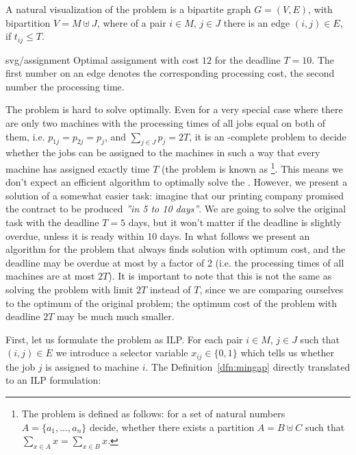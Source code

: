 \noindent
A natural visualization of the problem is a bipartite graph $G=(V,E)$, with bipartition $V=M\uplus J$,
where of a pair $i\in M$, $j\in J$ there is an edge  $(i,j)\in E$, if  $t_{ij}\le T$.

\begin{myfig}{0.65\textwidth}{svg/assignment}
  Optimal assignment with cost $12$ for the deadline $T=10$. The first number on an edge denotes the 
  corresponding processing cost, the second number the processing time.
\end{myfig}

\noindent
The problem \mingap is hard to solve optimally. Even for a very special case where there are only two machines with
the processing times of all jobs  equal on both of them, i.e. $p_{1j}=p_{2j}=p_j$, and $\sum_{j\in J}p_j=2T$,
it is an \NP-complete problem to decide whether the jobs can be assigned to the machines in such a way that
every machine has assigned exactly time $T$ (the problem is known as \footnote{
  The problem  is defined as follows: for a set of natural numbers  $A=\{a_1,\ldots,a_n\}$
decide, whether there exists a partition  $A=B\uplus C$ such that $\sum_{x\in A}x=\sum_{x\in B}x$.}.
This means we don't expect an efficient algorithm to optimally solve the \mingap. However, we present
a solution of a somewhat easier task: imagine that our printing company promised the contract to be
produced {\em ''in 5 to 10 days''}. We are going to solve the original task with the deadline $T=5$ days, 
but it won't matter if the deadline is slightly overdue, unless it is ready within 10 days. In what 
follows we present an algorithm for the \mingap problem that always finds solution with optimum cost, and the
deadline may be overdue at most by a factor of 2 (i.e. the processing times of all machines are at most $2T$).
It is important to note that this is not the same as solving the problem with limit $2T$ instead of $T$, 
since we are comparing
ourselves to the optimum of the original problem; the optimum cost of the problem with deadline $2T$ may
be much much smaller.

\noindent
First, let us formulate the problem \mingap as ILP. For each pair $i\in M$, $j\in J$ such that
$(i,j)\in E$ we introduce a selector variable $x_{ij}\in\{0,1\}$ which tells us whether the 
job $j$ is assigned to machine $i$.  The Definition~\ref{dfn:mingap} directly translated to an
ILP formulation:

